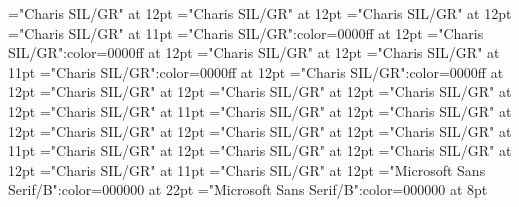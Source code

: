 \documentclass[a4paper,twoside]{article}
\begin{document}
\font\ftzxxNoteGeneralParagraphParagraphscrSectioncolumnsscrBookscrBody="Charis SIL/GR" at 12pt
\font\LinebscrSectioncolumnsscrBookscrBody="Charis SIL/GR" at 12pt
\font\VerseNumberzxxLinebscrSectioncolumnsscrBookscrBody="Charis SIL/GR" at 12pt
\font\spanzxxLinebscrSectioncolumnsscrBookscrBody="Charis SIL/GR" at 11pt
\font\SeeInGlossaryzxxLinebscrSectioncolumnsscrBookscrBody="Charis SIL/GR":color=0000ff at 12pt
\font\GlossaryKeySeeInGlossaryzxxLinebscrSectioncolumnsscrBookscrBody="Charis SIL/GR":color=0000ff at 12pt
\font\LinecscrSectioncolumnsscrBookscrBody="Charis SIL/GR" at 12pt
\font\spanzxxLinecscrSectioncolumnsscrBookscrBody="Charis SIL/GR" at 11pt
\font\SeeInGlossaryzxxParagraphscrSectioncolumnsscrBookscrBody="Charis SIL/GR":color=0000ff at 12pt
\font\GlossaryKeySeeInGlossaryzxxParagraphscrSectioncolumnsscrBookscrBody="Charis SIL/GR":color=0000ff at 12pt
\font\picturePageParagraphscrSectioncolumnsscrBookscrBody="Charis SIL/GR" at 12pt
\font\picturepicturePageParagraphscrSectioncolumnsscrBookscrBody="Charis SIL/GR" at 12pt
\font\pictureCaptionzxxpicturePageParagraphscrSectioncolumnsscrBookscrBody="Charis SIL/GR" at 12pt
\font\spanzxxpictureCaptionzxxpicturePageParagraphscrSectioncolumnsscrBookscrBody="Charis SIL/GR" at 11pt
\font{}="Charis SIL/GR" at 12pt
\font\pictureColumnParagraphscrSectioncolumnsscrBookscrBody="Charis SIL/GR" at 12pt
\font\picturepictureColumnParagraphscrSectioncolumnsscrBookscrBody="Charis SIL/GR" at 12pt
\font\pictureCaptionzxxpictureColumnParagraphscrSectioncolumnsscrBookscrBody="Charis SIL/GR" at 12pt
\font\spanzxxpictureCaptionzxxpictureColumnParagraphscrSectioncolumnsscrBookscrBody="Charis SIL/GR" at 11pt
\font{}="Charis SIL/GR" at 12pt
\font\ParagraphContinuationscrSectioncolumnsscrBookscrBody="Charis SIL/GR" at 12pt
\font\VerseNumberzxxParagraphContinuationscrSectioncolumnsscrBookscrBody="Charis SIL/GR" at 12pt
\font\spanzxxParagraphContinuationscrSectioncolumnsscrBookscrBody="Charis SIL/GR" at 11pt
\font\footnotequeryazxxNoteGeneralParagraphParagraphscrSectioncolumnsscrBookscrBody="Charis SIL/GR" at 12pt
\color{black} 
\thispagestyle{empty} 
\font\CoverPageTitle="Microsoft Sans Serif/B":color=000000 at 22pt 
\font\pFrontMatterdiv="Microsoft Sans Serif/B":color=000000 at 8pt 
\vskip 60pt 
\begin{center} 
\end{center} 
\end{document}
